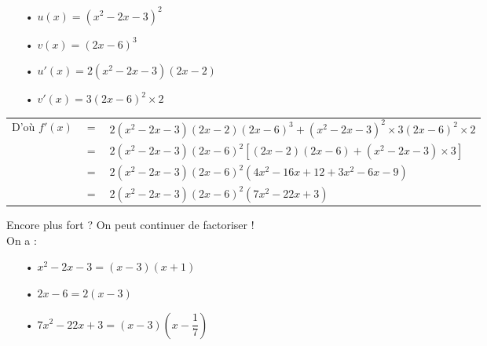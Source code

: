 \vspace*{.3cm}

\begin{itemize}
\item[•] $u(x) = \left(x^2 - 2x - 3\right)^2$ \\
\item[•] $v(x) = \left(2x -6\right)^3$ \\
\item[•] $u'(x) = 2\left(x^2 -2x - 3\right)\left(2x - 2\right)$ \\
\item[•] $v'(x) = 3\left(2x - 6\right)^2 \times 2$ \\
\end{itemize}

\begin{tabular}{lll}
D'où $f'(x)$ & $ = $ & $ 2\left(x^2 -2x - 3\right)\left(2x - 2\right)\left(2x -6\right)^3 + \left(x^2 - 2x - 3\right)^2 \times 3\left(2x - 6\right)^2 \times 2$ \vspace*{.3cm} \\
& $=$ & $2\left(x^2 - 2x - 3\right)\left(2x - 6\right)^2\left[\left(2x - 2\right)\left(2x - 6\right) + \left(x^2 - 2x - 3\right) \times 3\right]$ \vspace*{.3cm} \\
& $=$ & $2\left(x^2 - 2x - 3\right)\left(2x - 6\right)^2\left(4x^2 - 16x + 12 + 3x^2 - 6x - 9\right)$ \vspace*{.3cm} \\
& $=$ & $2\left(x^2 - 2x - 3\right)\left(2x - 6\right)^2\left(7x^2 - 22x +3\right)$ \\
\end{tabular}

\vspace*{.3cm}

Encore plus fort ? On peut continuer de factoriser ! \\

On a : \\

\begin{itemize}
\item[•] $x^2 - 2x - 3 = \left(x-3\right)\left(x+1\right)$ \\
\item[•] $2x - 6 = 2\left(x -3\right)$ \\
\item[•] $7x^2 - 22x + 3 = \left(x-3\right)\left(x-\dfrac{1}{7}\right)$ \\
\end{itemize}

